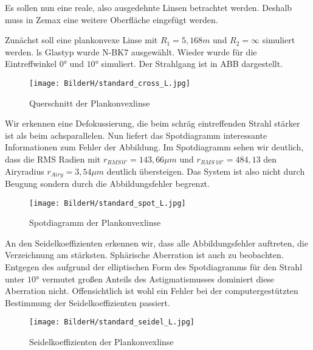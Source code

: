 \documentclass[twoside,colorback,accentcolor=tud4c,11pt]{tudreport}
\begin{document}
		Es sollen nun eine reale, also ausgedehnte Linsen betrachtet werden. Deshalb muss in Zemax eine weitere Oberfläche eingefügt werden. 
		
		Zunächst soll eine plankonvexe Linse mit $R_1 = 5,168 m$ und $R_2 = \infty$ simuliert werden. ls Glastyp wurde N-BK7 ausgewählt. Wieder wurde für die Eintreffwinkel $0°$ und $10°$ simuliert. Der Strahlgang ist in ABB dargestellt.
		
		
		\begin{figure}[H]
\centering
   	\begin{minipage}[b]{\textwidth}
\centering   	\texttt{[image: BilderH/standard\_cross\_L.jpg]}
   	\caption{Querschnitt der Plankonvexlinse}
  	\end{minipage}
\end{figure}
				
		
		Wir erkennen eine Defokussierung, die beim schräg eintreffenden Strahl stärker ist als beim achsparallelen.
	Nun liefert das Spotdiagramm interessante Informationen zum Fehler der Abbildung. Im Spotdiagramm sehen wir deutlich, dass die RMS Radien mit $r_{RMS \, 0°} = 143,66 \mu m $ und $r_{RMS \, 10°} = 484,13 $ den Airyradius $r_{Airy} = 3,54 \mu m$ deutlich übersteigen. Das System ist also nicht durch Beugung sondern durch die Abbildungsfehler begrenzt.
	
		\begin{figure}[H]
\centering
   	\begin{minipage}[b]{\textwidth}
\centering   	\texttt{[image: BilderH/standard\_spot\_L.jpg]}
   	\caption{Spotdiagramm der Plankonvexlinse}
  	\end{minipage}
\end{figure}
		
	An den Seidelkoeffizienten erkennen wir, dass alle Abbildungsfehler auftreten, die Verzeichnung am stärksten. Sphärische Aberration ist auch zu beobachten. Entgegen des aufgrund der elliptischen Form des Spotdiagramms für den Strahl unter $10°$ vermutet großen Anteils des Astigmatismusses dominiert diese Aberration nicht. Offensichtlich ist wohl ein Fehler bei der computergestützten Bestimmung der Seidelkoeffizienten passiert.
	
\begin{figure}[H]
\centering
   	\begin{minipage}[b]{\textwidth}
\centering   	\texttt{[image: BilderH/standard\_seidel\_L.jpg]}
   	\caption{Seidelkoeffizienten der Plankonvexlinse}
  	\end{minipage}
\end{figure}
	
\end{document}
